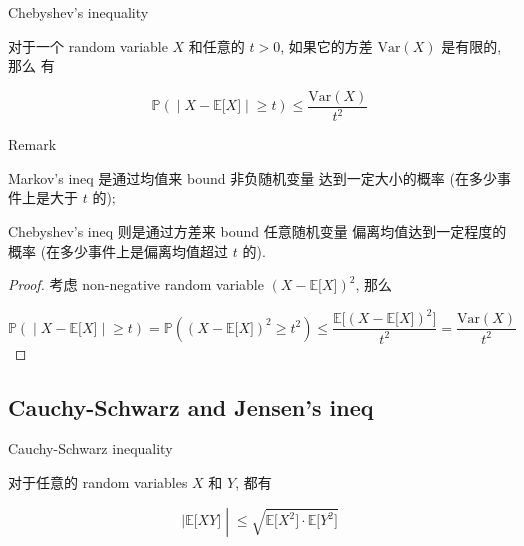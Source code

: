 \documentclass{qlnotes-export}
\begin{document}
\begin{corollary}{Chebyshev's inequality}\label{cor-04-lln-chebyshevs-inequality}

对于一个 random variable \(X\) 和任意的 \(t > 0\), 如果它的方差 \(\text{Var}(X)\) 是有限的, 那么 有

\[\left. {\mathbb{P}}( \middle| X - {\mathbb{E}}\lbrack X\rbrack \middle| \geq t) \leq \frac{\text{Var}(X)}{t^{2}} \right.\]

\end{corollary}

\begin{qlremark}{Remark}

Markov's ineq 是通过均值来 bound 非负随机变量 达到一定大小的概率 (在多少事件上是大于 \(t\) 的);

Chebyshev's ineq 则是通过方差来 bound 任意随机变量 偏离均值达到一定程度的概率 (在多少事件上是偏离均值超过 \(t\) 的).

\end{qlremark}

\begin{proof}

考虑 non-negative random variable \((X - {\mathbb{E}}\lbrack X\rbrack)^{2}\), 那么

\[\left. {\mathbb{P}}( \middle| X - {\mathbb{E}}\lbrack X\rbrack \middle| \geq t) = {\mathbb{P}}((X - {\mathbb{E}}\lbrack X\rbrack)^{2} \geq t^{2}) \leq \frac{{\mathbb{E}}\lbrack(X - {\mathbb{E}}\lbrack X\rbrack)^{2}\rbrack}{t^{2}} = \frac{\text{Var}(X)}{t^{2}} \right.\]

\end{proof}

\subsection{Cauchy-Schwarz and Jensen's ineq}\label{cauchy-schwarz-and-jensens-ineq}

\begin{theorem}{Cauchy-Schwarz inequality}\label{thm-04-lln-cauchy-schwarz-inequality}

对于任意的 random variables \(X\) 和 \(Y\), 都有

\[\left. |{\mathbb{E}}\lbrack XY\rbrack \middle| \leq \sqrt{{\mathbb{E}}\lbrack X^{2}\rbrack \cdot {\mathbb{E}}\lbrack Y^{2}\rbrack} \right.\]

\end{theorem}
\end{document}
